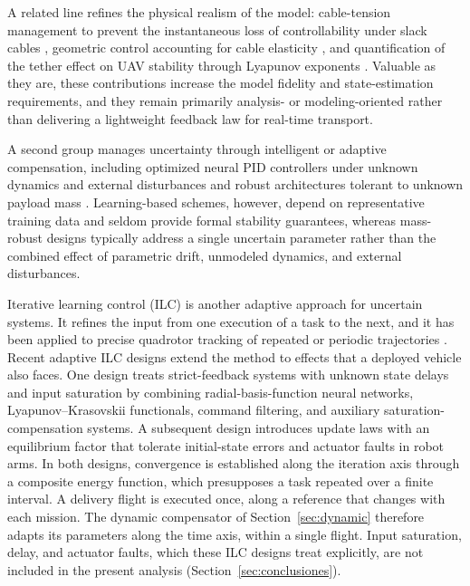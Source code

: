 \documentclass[sn-mathphys-num]{sn-jnl}
\theoremstyle{thmstyleone}%
\theoremstyle{thmstyletwo}%
\theoremstyle{thmstylethree}%
\begin{document}
A related line refines the physical realism of the model: cable-tension management to prevent the instantaneous loss of controllability under slack cables \cite{delbene2024cables}, geometric control accounting for cable elasticity \cite{goodman2023geometric}, and quantification of the tether effect on UAV stability through Lyapunov exponents \cite{tang2024analyzing}. Valuable as they are, these contributions increase the model fidelity and state-estimation requirements, and they remain primarily analysis- or modeling-oriented rather than delivering a lightweight feedback law for real-time transport.

A second group manages uncertainty through intelligent or adaptive compensation, including optimized neural PID controllers under unknown dynamics and external disturbances \cite{siwek2024application} and robust architectures tolerant to unknown payload mass \cite{outeiro2023control}. Learning-based schemes, however, depend on representative training data and seldom provide formal stability guarantees, whereas mass-robust designs typically address a single uncertain parameter rather than the combined effect of parametric drift, unmodeled dynamics, and external disturbances.

Iterative learning control (ILC) is another adaptive approach for uncertain systems. It refines the input from one execution of a task to the next, and it has been applied to precise quadrotor tracking of repeated or periodic trajectories \cite{schAR12,han2025sliding}. Recent adaptive ILC designs extend the method to effects that a deployed vehicle also faces. One design \cite{shen2025neural} treats strict-feedback systems with unknown state delays and input saturation by combining radial-basis-function neural networks, Lyapunov--Krasovskii functionals, command filtering, and auxiliary saturation-compensation systems. A subsequent design \cite{shen2026equilibrium} introduces update laws with an equilibrium factor that tolerate initial-state errors and actuator faults in robot arms. In both designs, convergence is established along the iteration axis through a composite energy function, which presupposes a task repeated over a finite interval. A delivery flight is executed once, along a reference that changes with each mission. The dynamic compensator of Section~\ref{sec:dynamic} therefore adapts its parameters along the time axis, within a single flight. Input saturation, delay, and actuator faults, which these ILC designs treat explicitly, are not included in the present analysis (Section~\ref{sec:conclusiones}).
\end{document}
